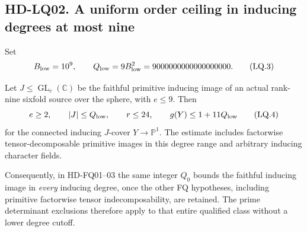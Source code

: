 \subsection*{HD-LQ02. A uniform order ceiling in inducing degrees at most nine}

Set
\[
 B_{\rm low}=10^9,\qquad
 Q_{\rm low}=9B_{\rm low}^2=9000000000000000000.
 \tag{LQ.3}
\]

\begin{theorem}[HD-LQ02]
Let \(J\le\operatorname{GL}_e(\mathbb C)\) be the faithful
primitive inducing image of an actual rank-nine sixfold source
over the sphere, with \(e\le9\).
Then
\[
 e\ge2,\qquad |J|\le Q_{\rm low},\qquad
 r\le24,\qquad g(Y)\le1+11Q_{\rm low}
 \tag{LQ.4}
\]
for the connected inducing \(J\)-cover \(Y\to\mathbb P^1\).
The estimate includes factorwise tensor-decomposable primitive
images in this degree range and arbitrary inducing character fields.

Consequently, in HD-FQ01--03 the same integer \(Q_0\) bounds the
faithful inducing image in \emph{every} inducing degree, once the
other FQ hypotheses, including primitive factorwise tensor
indecomposability, are retained. The prime determinant exclusions
therefore apply to that entire qualified class without a lower
degree cutoff.
\end{theorem}

